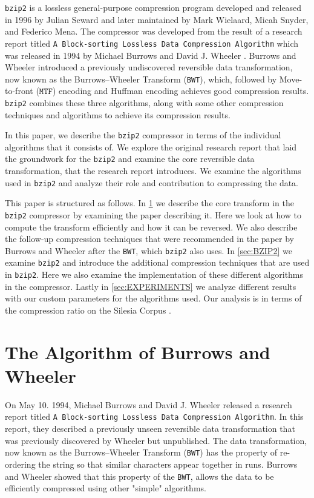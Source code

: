 \documentclass{article}
\begin{document}

\texttt{bzip2} is a lossless general-purpose compression program developed and released in 1996 by Julian Seward and later maintained by Mark Wielaard, Micah Snyder, and Federico Mena. %
The compressor was developed from the result of a research report titled \texttt{A Block-sorting Lossless Data Compression Algorithm} which was released in 1994 by Michael Burrows and David J. Wheeler \cite{bwt1} \cite{manzini1999burrows}.
Burrows and Wheeler introduced a previously undiscovered reversible data transformation, now known as the Burrows--Wheeler Transform (\texttt{BWT}), which, followed by Move-to-front (\(\texttt{MTF}\)) encoding \cite{bentley1986locally} and Huffman encoding \cite{huffman1952method} achieves good compression results.
\texttt{bzip2} combines these three algorithms, along with some other compression techniques and algorithms to achieve its compression results.

In this paper, we describe the \texttt{bzip2} compressor in terms of the individual algorithms that it consists of. 
We explore the original research report that laid the groundwork for the \texttt{bzip2} and examine the core reversible data transformation, that the research report introduces. 
We examine the algorithms used in \texttt{bzip2} and analyze their role and contribution to compressing the data.

This paper is structured as follows. In \cref{sec:TABW} we describe the core transform in the \texttt{bzip2} compressor by examining the paper describing it. Here we look at how to compute the transform efficiently and how it can be reversed. We also describe the follow-up compression techniques that were recommended in the paper by Burrows and Wheeler after the \texttt{BWT}, which \texttt{bzip2} also uses. In \cref{sec:BZIP2} we examine \texttt{bzip2} and introduce the additional compression techniques that are used in \texttt{bzip2}. Here we also examine the implementation of these different algorithms in the compressor. Lastly in \cref{sec:EXPERIMENTS} we analyze different results with our custom parameters for the algorithms used. Our analysis is in terms of the compression ratio on the Silesia Corpus \cite{silesiaCorpus}.


\section{The Algorithm of Burrows and Wheeler}\label{sec:TABW}
On May 10. 1994, Michael Burrows and David J. Wheeler released a research report titled \texttt{A Block-sorting Lossless Data Compression Algorithm}. In this report, they described a previously unseen reversible data transformation that was previously discovered by Wheeler but unpublished. The data transformation, now known as the Burrows--Wheeler Transform (\texttt{BWT}) has the property of re-ordering the string so that similar characters appear together in runs.
Burrows and Wheeler showed that this property of the \texttt{BWT}, allows the data to be efficiently compressed using other "simple" algorithms.
\end{document}
